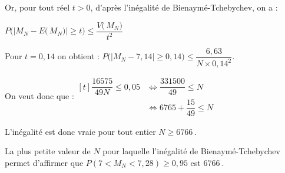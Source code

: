 \documentclass[10pt]{article}
\providecommand{\np}[2][]{{#2~#1}}
\begin{document}
\begin{enumerate}
\begin{enumerate}
Or, pour tout réel $t > 0$, d'après l'inégalité de Bienaymé-Tchebychev, on a :

$P\Big(\big|M_N-E\big(\,M_N\big)\big| \geqslant t\Big) \leqslant \dfrac{V\big(\,M_N\big)}{t^2}$

Pour $t = 0,14$ on obtient : $ P\Big(\big|M_N-7,14\big| \geqslant 0,14\Big)\leqslant \dfrac{6,63}{ N \times 0,14^2}$.

On veut donc que :\quad $\begin{aligned}[t]
	\dfrac{16575}{49 N} \leqslant 0,05 &\iff
	\dfrac{331500}{49} \leqslant N \\
	&\iff 6765+\dfrac{15}{49}\leqslant N
\end{aligned}$

L'inégalité est donc vraie pour tout entier $N \geqslant \np{6766}$.

La plus petite valeur de $N$ pour laquelle l'inégalité de Bienaymé-Tchebychev permet d'affirmer que $P\left(7<M_{N}<7,28\right) \geqslant 0,95$ est $\np{6766}$.

	\end{enumerate}
\end{enumerate}

\bigskip
\end{document}
